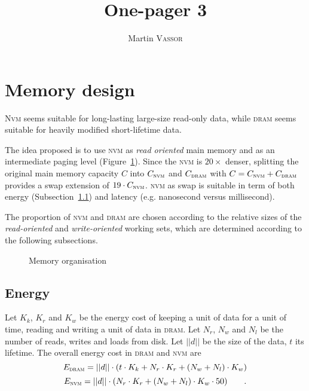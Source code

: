 \documentclass[twocolumn]{article}
\title{One-pager 3}
\author{Martin \textsc{Vassor}}
\date{}
\begin{document}
\maketitle
\section{Memory design}
\textsc{Nvm} seems suitable for long-lasting large-size read-only data, while \textsc{dram} seems suitable for heavily modified short-lifetime data. 

The idea proposed is to use \textsc{nvm} as \emph{read oriented} main memory and as an intermediate paging level (Figure~\ref{fig:mem_org}). Since the \textsc{nvm} is $20\times$ denser, splitting the original main memory capacity $C$ into $C_{\textsc{nvm}}$ and $C_{\textsc{dram}}$ with $C = C_{\textsc{nvm}} + C_{\textsc{dram}}$ provides a swap extension of $19\cdot C_{\textsc{nvm}}$. \textsc{nvm} as swap is suitable in term of both energy (Subsection~\ref{subsec:energy}) and latency (e.g. nanosecond versus millisecond).

The proportion of \textsc{nvm} and \textsc{dram} are chosen according to the relative sizes of the \emph{read-oriented} and \emph{write-oriented} working sets, which are determined according to the following subsections.
\begin{figure}[b]
\centering
{}
\caption{Memory organisation}
\label{fig:mem_org}
\end{figure}

\subsection{Energy}
\label{subsec:energy}
Let $K_k$, $K_r$ and $K_w$ be the energy cost of keeping a unit of data for a unit of time, reading and writing a unit of data in \textsc{dram}. Let $N_r$, $N_w$ and $N_l$ be the number of reads, writes and loads from disk. Let $||d||$ be the size of the data, $t$ its lifetime.
The overall energy cost in \textsc{dram} and \textsc{nvm} are 
$$E_{\textsc{dram}} = ||d|| \cdot (t\cdot K_k + N_r\cdot K_r + (N_w + N_l)\cdot K_w)$$
$$E_{\textsc{nvm}} = ||d||\cdot (N_r\cdot K_r +(N_w + N_l)\cdot K_w\cdot 50) \qquad .$$
\end{document}
